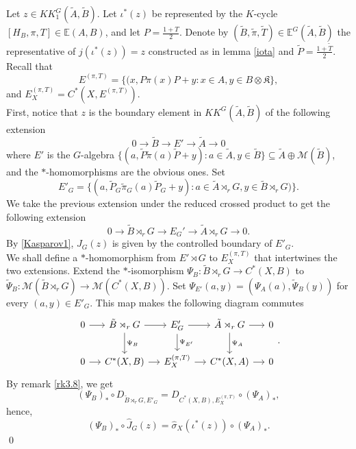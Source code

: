 \begin{dem}
Let $z\in KK_1^G(\tilde A,\tilde B)$. Let $\iota^*(z)$ be represented by the $K$-cycle $[H_{B},\pi,T]\in\mathbb E(A,B)$, and let $P=\frac{1+T}{2}$. Denote by $(\tilde B,\tilde \pi ,\tilde T)\in \mathbb E^G(\tilde A,\tilde B)$ the representative of $j(\iota^*(z))=z$ constructed as in lemma \ref{iota} and $\tilde P=\frac{1+\tilde T}{2}$. Recall that 
\[E^{(\pi,T)} = \{(x,P\pi(x)P+y : x\in A,y\in B\otimes\mathfrak K\},\] 
and $E^{(\pi,T)}_X=C^*(X,E^{(\pi,T)})$. \\

First, notice that $z$ is the boundary element in $KK^G(\tilde A,\tilde B)$ of the following extension 
\[0 \rightarrow \tilde B \rightarrow E'\rightarrow \tilde A \rightarrow 0\]
where $E'$ is the $G$-algebra $\{ (a,\tilde P \tilde \pi(a) \tilde P+y) : a\in \tilde A, y \in \tilde B  \}\subseteq \tilde A\oplus \mathcal M(\tilde B) $, and the $*$-homomorphisms are the obvious ones. Set 
\[E'_G=\{ (a,\tilde P_G \tilde \pi_G(a) \tilde P_G+y) : a\in \tilde A\rtimes_r G, y \in \tilde B\rtimes_r G    )\}.\] 
We take the previous extension under the reduced crossed product to get the following extension
\[0 \rightarrow \tilde B\rtimes_r G \rightarrow E_G'\rightarrow \tilde A\rtimes_r G \rightarrow 0.\]
By \ref{Kasparov1}, $J_G(z)$ is given by the controlled boundary of $E'_G$. \\

We shall define a $*$-homomorphism from $E'\rtimes G$ to $E^{(\pi,T)}_X$ that intertwines the two extensions. Extend the $*$-isomorphism $\Psi_B : \tilde B \rtimes_r G \rightarrow C^*(X,B)$ to $\tilde \Psi_B : \mathcal M(\tilde B \rtimes_r G) \rightarrow \mathcal M(C^*(X,B))$. Set $\Psi_{E'} (a,y) = (\Psi_A(a),\tilde \Psi_B(y)) $ for every $(a,y)\in E'_G$. This map makes the following diagram commutes
\[
\begin{tikzcd}[column sep = small]
0\arrow{r} & \tilde B\rtimes_r G \arrow{r} \arrow{d}{\Psi_B} & E'_G \arrow{r}\arrow{d}{\Psi_{E'}} &
			 \tilde A\rtimes_r G\arrow{r}\arrow{d}{\Psi_A} & 0 \\
0\arrow{r} & C^*(X,B) \arrow{r} & E^{(\pi,T)}_X  \arrow{r} & C^*(X,A)\arrow{r} & 0 
\end{tikzcd}.
\]
By remark \ref{rk3.8}, we get 
\[  (\Psi_B)_* \circ D_{\tilde B\rtimes_r G, E'_G} = D_{ C^*(X,B), E^{(\pi,T)}_X} \circ (\Psi_A)_*,\]
hence,
\[ (\Psi_B)_*\circ \hat J_G(z) = \hat\sigma_X(\iota^*(z)) \circ (\Psi_A)_*.\]
\qed
\end{dem}

